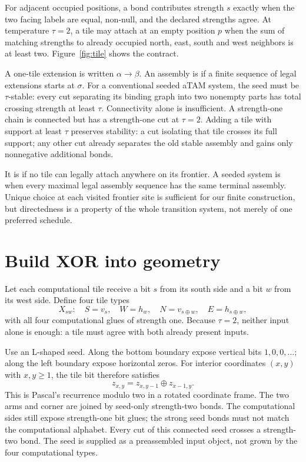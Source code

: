 For adjacent occupied positions, a bond contributes strength $s$ exactly when
the two facing labels are equal, non-null, and the declared strengths agree.
At temperature $\tau=2$, a tile may attach at an empty position $p$ when the
sum of matching strengths to already occupied north, east, south and west
neighbors is at least two. Figure~\ref{fig:tile} shows the contract.


A one-tile extension is written $\alpha\to\beta$. An assembly is
 if a finite sequence of legal extensions starts at $\sigma$.
For a conventional seeded aTAM system, the seed must be $\tau$-stable:
every cut separating its binding graph into two nonempty parts has total crossing
strength at least $\tau$. Connectivity alone is insufficient. A strength-one
chain is connected but has a strength-one cut at $\tau=2$.
Adding a tile with support at least $\tau$ preserves stability: a cut isolating
that tile crosses its full support; any other cut already separates the old
stable assembly and gains only nonnegative additional bonds.


It is  if no tile can legally attach anywhere on its frontier.
A seeded system is  when every maximal legal assembly sequence
has the same terminal assembly. Unique choice at each visited frontier site is
sufficient for our finite construction, but directedness is a property of the
whole transition system, not merely of one preferred schedule.

\section{Build XOR into geometry}

Let each computational tile receive a bit $s$ from its south side and a bit $w$
from its west side. Define four tile types
\[
X_{sw}:\quad S=v_s,\quad W=h_w,\quad N=v_{s\oplus w},
\quad E=h_{s\oplus w},
\]
with all four computational glues of strength one. Because $\tau=2$, neither
input alone is enough: a tile must agree with both already present inputs.

Use an L-shaped seed. Along the bottom boundary expose vertical bits
$1,0,0,\ldots$; along the left boundary expose horizontal zeros. For interior
coordinates $(x,y)$ with $x,y\ge1$, the tile bit therefore satisfies
\begin{equation}
 z_{x,y}=z_{x,y-1}\oplus z_{x-1,y}.
 \label{dnad22:xor}
\end{equation}
This is Pascal's recurrence modulo two in a rotated coordinate frame.
The two arms and corner are joined by seed-only strength-two bonds. The
computational sides still expose strength-one bit glues; the strong seed bonds
must not match the computational alphabet. Every cut of this connected seed
crosses a strength-two bond. The seed is supplied as a preassembled input
object, not grown by the four computational types.

